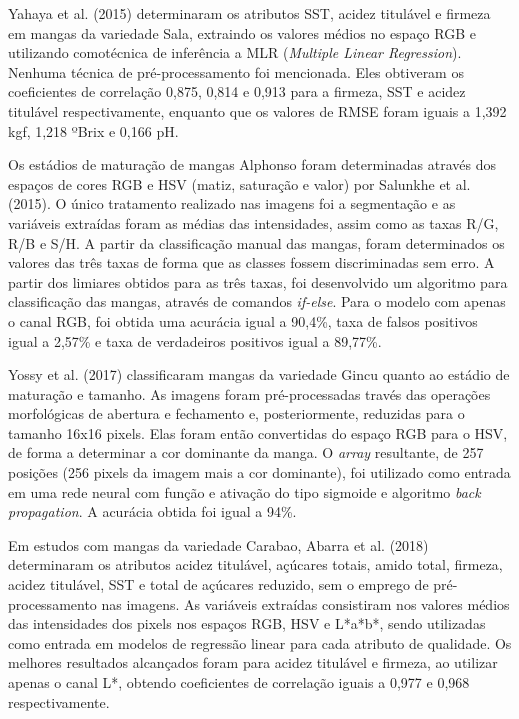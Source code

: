 Yahaya et al. (2015) determinaram os atributos SST, acidez titulável e firmeza em mangas da variedade Sala, extraindo os valores médios no espaço RGB e utilizando comotécnica de inferência a MLR (\textit{Multiple Linear Regression}). Nenhuma técnica de pré-processamento foi mencionada. Eles obtiveram os coeficientes de correlação 0,875, 0,814 e 0,913 para a firmeza, SST e acidez titulável respectivamente, enquanto que os valores de RMSE foram iguais a 1,392 kgf, 1,218 ºBrix e 0,166 pH.

Os estádios de maturação de mangas Alphonso foram determinadas através dos espaços de cores RGB e HSV (matiz, saturação e valor) por Salunkhe et al. (2015). O único tratamento realizado nas imagens foi a segmentação e as variáveis extraídas foram as médias das intensidades, assim como as taxas R/G, R/B e S/H. A partir da classificação manual das mangas, foram determinados os valores das três taxas de forma que as classes fossem discriminadas sem erro. A partir dos limiares obtidos para as três taxas, foi desenvolvido um algoritmo para classificação das mangas, através de comandos \textit{if-else}. Para o modelo com apenas o canal RGB, foi obtida uma acurácia igual a 90,4\%, taxa de falsos positivos igual a 2,57\% e taxa de verdadeiros positivos igual a 89,77\%. 

Yossy et al. (2017) classificaram mangas da variedade Gincu quanto ao estádio de maturação e tamanho. As imagens foram pré-processadas través das operações morfológicas de abertura e fechamento e, posteriormente, reduzidas para o tamanho 16x16 pixels. Elas foram então convertidas do espaço RGB para o HSV, de forma a determinar a cor dominante da manga. O \textit{array} resultante, de 257 posições (256 pixels da imagem mais a cor dominante), foi utilizado como entrada em uma rede neural com função e ativação do tipo sigmoide e algoritmo \textit{back propagation}. A acurácia obtida foi igual a 94\%.

Em estudos com mangas da variedade Carabao, Abarra et al. (2018) determinaram os atributos acidez titulável, açúcares totais, amido total, firmeza, acidez titulável, SST e total de açúcares reduzido, sem o emprego de pré-processamento nas imagens. As variáveis extraídas consistiram nos valores médios das intensidades dos pixels nos espaços RGB, HSV e L*a*b*, sendo utilizadas como entrada em modelos de regressão linear para cada atributo de qualidade. Os melhores resultados alcançados foram para acidez titulável e firmeza, ao utilizar apenas o canal L*, obtendo coeficientes de correlação iguais a 0,977 e 0,968 respectivamente. 

